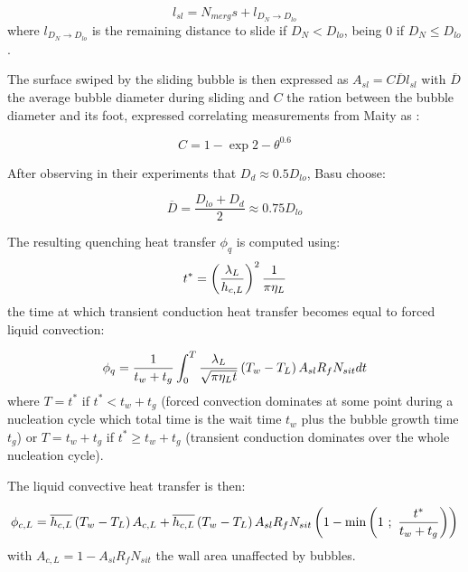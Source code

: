 \begin{equation}
l_{sl}=N_{merg}s + l_{D_{N}\rightarrow D_{lo}}
\end{equation}
where $l_{D_{N}\rightarrow D_{lo}}$ is the remaining distance to slide if $D_{N}<D_{lo}$, being $0$ if $D_{N} \leq D_{lo}$.

The surface swiped by the sliding bubble is then expressed as $A_{sl} = C\overline{D}l_{sl}$ with $\overline{D}$ the average bubble diameter during sliding and $C$ the ration between the bubble diameter and its foot, expressed correlating measurements from Maity \cite{maity_effect_2000} as :

\begin{equation}
C=1-\exp{2-\theta ^{0.6}}
\end{equation}

After observing in their experiments that $D_{d}\approx 0.5D_{lo}$, Basu \etal choose:

\begin{equation}
\overline{D}=\frac{D_{lo}+D_{d}}{2}\approx 0.75D_{lo}
\end{equation}


The resulting quenching heat transfer $\phi_{q}$ is computed using:
\begin{equation}
t^{*}=\left( \dfrac{\lambda_{L}}{h_{c,L}} \right)^{2} \dfrac{1}{\pi \eta_{L}}
\label{eq:basu_hfp_tstar}
\end{equation} the time at which transient conduction heat transfer becomes equal to forced liquid convection:

\begin{equation}
\phi_{q} = \frac{1}{t_{w}+t_{g}} \int_{0}^{T}\frac{\lambda_{L}}{\sqrt{\pi \eta_{L}t}}\left( T_{w}-T_{L} \right)A_{sl}R_{f}N_{sit}dt
\end{equation}
where $T=t^{*}$ if $t^{*}<t_{w}+t_{g}$ (forced convection dominates at some point during a nucleation cycle which total time is the wait time $t_{w}$ plus the bubble growth time $t_{g}$) or $T=t_{w}+t_{g}$ if $t^{*}\geq t_{w}+t_{g}$ (transient conduction dominates over the whole nucleation cycle).

\npar
The liquid convective heat transfer is then:

\begin{equation}
\phi_{c,L} = \overline{h_{c,L}}\parth{T_{w}-T_{L}}A_{c,L} + \overline{h_{c,L}}\parth{T_{w}-T_{L}}A_{sl}R_{f}N_{sit}\parth{1-\mathrm{min}\parth{1\ ;\ \frac{t^{*}}{t_{w}+t_{g}}}}
\label{eq:basu_hfp_phicL}
\end{equation}
with $A_{c,L} = 1 - A_{sl}R_{f}N_{sit}$ the wall area unaffected by bubbles.


